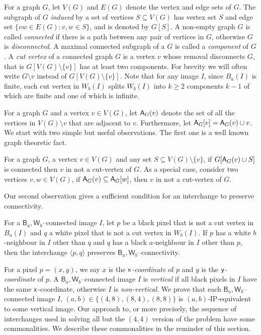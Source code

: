 \documentclass[lotsofwhite,charterfonts]{patmorin}
\newcommand{\x}{\ensuremath{\protect\textup{\textsf{x}}}}
\newcommand{\y}{\ensuremath{\protect\textup{\textsf{y}}}}
\newcommand{\ic}[2]{\langle #1,#2 \rangle}
\newcommand{\A}[2]{\ensuremath{\protect\textup{\textsf{A}}_{#2}(#1)}}
\newcommand{\AC}[2]{\ensuremath{\protect\textup{\textsf{A}}_{#2}[#1]}}
\newcommand{\sm}{\ensuremath{\setminus}}
\newcommand{\se}{\ensuremath{\subseteq}}
\begin{document}
For a graph $G$, let $V(G)$ and $E(G)$ denote the vertex and edge sets
of $G$. The subgraph of $G$ \emph{induced} by a set of vertices $S\se
V(G)$ has vertex set $S$ and edge set $\{vw\in E(G):v, w\in S\}$, and
is denoted by $G[S]$.  A non-empty graph $G$ is called
\emph{connected} if there is a path between any pair of vertices in
$G$, otherwise $G$ is \emph{disconnected}. A maximal connected
subgraph of a $G$ is called a \emph{component} of $G$. A \emph{cut
vertex} of a connected graph $G$ is a vertex $v$ whose removal
disconnects $G$, that is  $G[V(G)\sm \{v\}]$ has at least two components.
For brevity we will often write $G\sm v$ instead of $G[V(G)\sm \{v\}]$.
Note that for any image $I$, since $B_a(I)$ is finite, each cut vertex
in $W_b(I)$ splits $W_b(I)$ into $k\geq 2$ components  $k-1$ of which
are finite and one of which is infinite. 

For a graph $G$ and a vertex $v\in V(G)$, let \A{v}{G} denote the set
of all the vertices in $V(G)\sm v$ that are adjacent to $v$.
Furthermore, let  $\AC{v}{G}=\A{v}{G}\cup v$. We start with two simple
but useful observations. The first one is a well known graph theoretic
fact. 

\begin{obs}
For a graph $G$, a vertex $v\in V(G)$ and any set $S\se V(G)\sm
\{v\}$, if $G[\A{v}{G}\cup S]$ is connected then $v$ in not a
cut-vertex of $G$.  As a special case,  consider two vertices $v, w\in
V(G)$, if $\A{v}{G}\se \AC{w}{G}$, then $v$ in not a cut-vertex of
$G$.
\end{obs}

Our second observation gives a sufficient condition for an interchange
to preserve connectivity.

\begin{obs} 
For a $\textsf{B}_a,\textsf{W}_b$--connected image $I$, let $p$ be a
black pixel that is not a cut vertex in $B_a(I)$ and $q$ a white pixel
that is not a cut vertex in $W_b(I)$. If $p$ has a white $b$-neighbour
in $I$ other than $q$ and $q$ has a black $a$-neighbour in $I$ other
than $p$, then the interchange $\ic{p}{q}$ preserves
$\textsf{B}_a,\textsf{W}_b$--connectivity.  
\end{obs}


For a pixel $p=(x,y)$, we say $x$ is the \emph{\x-coordinate} of $p$
and $y$ is the \emph{\y-coordinate} of $p$. A
$\textsf{B}_a,\textsf{W}_b$--connected image $I$ is \emph{vertical} if
all black pixels in $I$ have the same \x-coordinate, otherwise $I$ is
\emph{non-vertical}. We prove that each
$\textsf{B}_a,\textsf{W}_b$--connected image $I$, $(a,b)\in \{(4,8),
(8,4), (8,8)\}$ is $(a,b)$-IP-equivalent to some vertical image. Our
approach to, or more precisely, the sequence of interchanges used in
solving  all but the $(4,4)$ version of the problem have some
commonalities.  We describe these commonalities in the reminder of
this section. 
\end{document}
